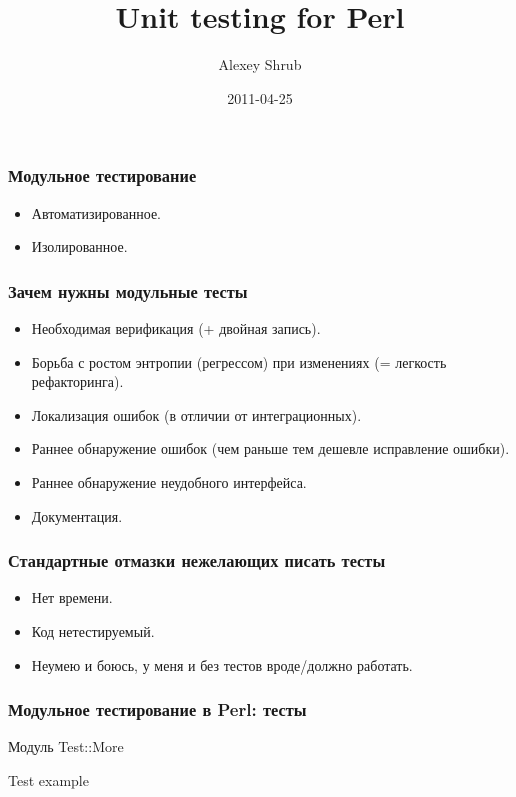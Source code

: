 \documentclass{beamer}
\title{Unit testing for Perl}
\author{Alexey Shrub}
\institute{ashrub@yandex.ru}
\date{2011-04-25}
\begin{document}
\maketitle

\begin{frame}
\frametitle{Модульное тестирование}
\begin{itemize}
\item Автоматизированное.
\item Изолированное.
\end{itemize}
\end{frame}

\begin{frame}
\frametitle{Зачем нужны модульные тесты}
\begin{itemize}
\item Необходимая верификация (+ двойная запись).
\item Борьба с ростом энтропии (регрессом) при изменениях (= легкость рефакторинга).
\item Локализация ошибок (в отличии от интеграционных).
\item Раннее обнаружение ошибок (чем раньше тем дешевле исправление ошибки).
\item Раннее обнаружение неудобного интерфейса.
\item Документация.
\end{itemize}
\end{frame}

\begin{frame}
\frametitle{Стандартные отмазки нежелающих писать тесты}
\begin{itemize}
\item Нет времени.
\item Код нетестируемый.
\item Неумею и боюсь, у меня и без тестов вроде/должно работать.
\end{itemize}
\end{frame}

\begin{frame}[fragile]
\frametitle{Модульное тестирование в Perl: тесты}
Модуль Test::More
\begin{block}{Test example}

\end{block}
\end{frame}
\end{document}
